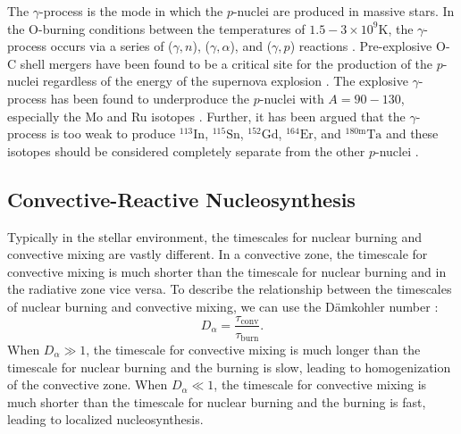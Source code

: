 The $\gamma$-process is the mode in which the $p$-nuclei are produced in massive stars.
In the O-burning conditions between the temperatures of $1.5{-}3\times10^9 \mathrm{K}$, the $\gamma$-process occurs via a series of ($\gamma,n$), ($\gamma,\alpha$), and ($\gamma,p$) reactions \citep{rauscherNucleosynthesisMassiveStars2002,rappSensitivityPProcessNucleosynthesis2006, rauscherConstrainingAstrophysicalOrigin2013}.
Pre-explosive O-C shell mergers have been found to be a critical site for the production of the $p$-nuclei regardless of the energy of the supernova explosion \citep{ritterConvectivereactiveNucleosynthesisSc2018, robertiGprocessNucleosynthesisCorecollapse2023, robertiGprocessNucleosynthesisCorecollapse2024b}. 
The explosive $\gamma$-process has been found to underproduce the $p$-nuclei with $A=90-130$, especially the Mo and Ru isotopes \citep{arnouldPprocessStellarNucleosynthesis2003,woosleyNucleosynthesisRemnantsMassive2007}.
Further, it has been argued that the $\gamma$-process is too weak to produce $^{113}\mathrm{In}$, $^{115}\mathrm{Sn}$, $^{152}\mathrm{Gd}$, $^{164}\mathrm{Er}$, and $^{180\mathrm{m}}\mathrm{Ta}$ and these isotopes should be considered completely separate from the other $p$-nuclei \citep{rayetPprocessRevisited1990,dillmannPProcessSimulationsModified2008}.

\subsection{Convective-Reactive Nucleosynthesis}

Typically in the stellar environment, the timescales for nuclear burning and convective mixing are vastly different.
In a convective zone, the timescale for convective mixing is much shorter than the timescale for nuclear burning and in the radiative zone vice versa.
To describe the relationship between the timescales of nuclear burning and convective mixing, we can use the Dämkohler number \citep{herwigCONVECTIVEREACTIVEPROTON2011}:
\begin{equation}
D_\alpha = \frac{\tau_{\mathrm{conv}}}{\tau_{\mathrm{burn}}}.
\end{equation}
When $D_\alpha \gg 1$, the timescale for convective mixing is much longer than the timescale for nuclear burning and the burning is slow, leading to homogenization of the convective zone.
When $D_\alpha \ll 1$, the timescale for convective mixing is much shorter than the timescale for nuclear burning and the burning is fast, leading to localized nucleosynthesis.

